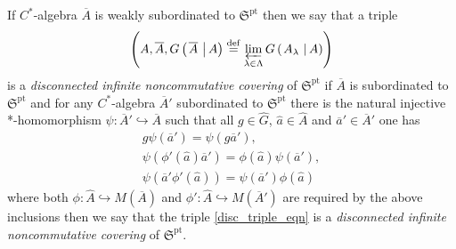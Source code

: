 \documentclass{beamer}
\theoremstyle{plain}
\newcommand{\be}{\begin{equation}}
\newcommand{\ee}{\end{equation}}
\newcommand{\la}{\lambda}
\newcommand{\La}{\Lambda}
\newcommand{\bydef}{\stackrel{\mathrm{def}}{=}}
\newcommand{\hookto}{\hookrightarrow}        %
\begin{document}
\begin{frame}
 \begin{definition}\label{disconnected_infinite_noncommutative_covering_defn}
	If $C^*$-algebra $\overline{A}$ is weakly subordinated to	$\mathfrak{S}^{\text{pt}}$  then we say that   a triple
	\be\label{disc_triple_eqn}
	\left(A, \overline{A}, G\left(\left.\overline{A}~\right| A\right)\bydef  \varprojlim_{\la\in\La}G\left(\left.A_\la~\right| A\right)\right)
	\ee
	is a \textit{disconnected infinite noncommutative covering} of $\mathfrak{S}^{\text{pt}}$  if $\overline{A}$ is subordinated to	
	$\mathfrak{S}^{\mathrm{pt}}$ and for any $C^*$-algebra $\overline{A}'$ subordinated to	$\mathfrak{S}^{\text{pt}}$  there is the natural injective *-homomorphism
	$\psi : \overline{A}'\hookto\overline{A}$ such that all
	$g \in \widehat{G}$,  $\widehat a \in \widehat{A}$ and $\overline a' \in \overline{A}'$ one has
	\be\label{disconnected_lim_eqn}
	\begin{split}
		g \psi\left( \overline{a}'\right) = \psi\left(g \overline{a}'\right),\\
		\psi\left(\phi'\left( \widehat  a\right)\overline a'  \right) = 	\phi\left( \widehat  a\right)\psi\left( \overline a'  \right),\\
		\psi\left(\overline a' \phi'\left( \widehat  a\right) \right) = 	\psi\left( \overline a'  \right)\phi\left( \widehat  a\right)
	\end{split}
	\ee
	where both $\phi: \widehat A \hookto M\left(\overline A\right)$ and $\phi': \widehat A \hookto M\left(\overline A'\right)$ are required by the above inclusions then we say that the triple \eqref{disc_triple_eqn} is a  \textit{disconnected infinite noncommutative covering} of $\mathfrak{S}^{\text{pt}}$. 
\end{definition}
\end{frame}
\end{document}
